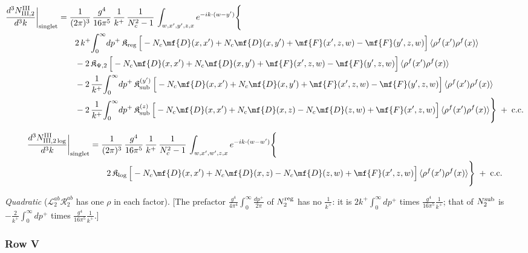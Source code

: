 \begin{align}
\frac{d^{3}N^{\rm III}_{{\rm III},2}}{d^{3}k}\bigg|_{\rm singlet}&=\frac{1}{(2\pi)^{3}}\,\frac{g^{4}}{16\pi^{5}}\,\frac{1}{k^{+}}\,\frac{1}{N_{c}^{2}-1}\,\int_{w,x',y',z,x}e^{-ik\cdot(w-y')}\Bigg\{\notag\\
&\qquad 2\,k^{+}\!\int_{0}^{\infty}\!dp^{+}\,\mathfrak{K}_{\rm reg}\,\Big[-N_{c}\mf{D}(x,x')+N_{c}\mf{D}(x,y')+\mf{F}(x',z,w)-\mf{F}(y',z,w)\Big]\,\langle\rho^{f}(x')\rho^{f}(x)\rangle\notag\\
&\qquad -2\,\mathfrak{K}_{\Psi,2}\,\Big[-N_{c}\mf{D}(x,x')+N_{c}\mf{D}(x,y')+\mf{F}(x',z,w)-\mf{F}(y',z,w)\Big]\,\langle\rho^{f}(x')\rho^{f}(x)\rangle\notag\\
&\qquad -2\,\frac{1}{k^{+}}\!\int_{0}^{\infty}\!dp^{+}\,\mathfrak{K}_{\rm sub}^{(y')}\,\Big[-N_{c}\mf{D}(x,x')+N_{c}\mf{D}(x,y')+\mf{F}(x',z,w)-\mf{F}(y',z,w)\Big]\,\langle\rho^{f}(x')\rho^{f}(x)\rangle\notag\\
&\qquad -2\,\frac{1}{k^{+}}\!\int_{0}^{\infty}\!dp^{+}\,\mathfrak{K}_{\rm sub}^{(z)}\,\Big[-N_{c}\mf{D}(x,x')+N_{c}\mf{D}(x,z)-N_{c}\mf{D}(z,w)+\mf{F}(x',z,w)\Big]\,\langle\rho^{f}(x')\rho^{f}(x)\rangle\Bigg\}\;+\;{\rm c.c.}\label{eq:s-III-III-2}
\end{align}

\begin{align}
\frac{d^{3}N^{\rm III}_{{\rm III},2\log}}{d^{3}k}\bigg|_{\rm singlet}&=\frac{1}{(2\pi)^{3}}\,\frac{g^{4}}{16\pi^{5}}\,\frac{1}{k^{+}}\,\frac{1}{N_{c}^{2}-1}\,\int_{w,x',w',z,x}e^{-ik\cdot(w-w')}\Bigg\{\notag\\
&\qquad 2\,\mathfrak{K}_{\log}\,\Big[-N_{c}\mf{D}(x,x')+N_{c}\mf{D}(x,z)-N_{c}\mf{D}(z,w)+\mf{F}(x',z,w)\Big]\,\langle\rho^{f}(x')\rho^{f}(x)\rangle\Bigg\}\;+\;{\rm c.c.}\label{eq:s-III-III-2log}
\end{align}

\emph{Quadratic} ($\mathcal{L}^{ab}_{2}\mathcal{R}^{ab}_{2}$ has one $\rho$ in each factor). [The prefactor $\frac{g^{4}}{4\pi^{4}}\int_{0}^{\infty}\frac{dp^{+}}{2\pi}$ of $N_{2}^{\rm reg}$ has no $\frac{1}{k^{+}}$: it is $2k^{+}\int_{0}^{\infty}dp^{+}$ times $\frac{g^{4}}{16\pi^{5}}\frac{1}{k^{+}}$; that of $N_{2}^{\rm sub}$ is $-\frac{2}{k^{+}}\int_{0}^{\infty}dp^{+}$ times $\frac{g^{4}}{16\pi^{5}}\frac{1}{k^{+}}$.]
\subsubsection*{Row V}

